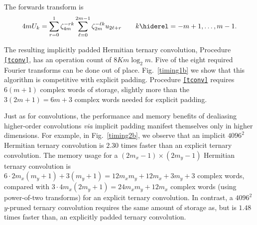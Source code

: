 \documentclass[final]{siamltex}
\def\be{\begin{dmath*}}
\def\ee{\end{dmath*}}
\def\no{\hiderel}
\begin{document}
The forwards transform is
\be
{4m}U_k=\sum_{r=0}^{1}\zeta_{4m}^{-rk}
\sum_{\ell=0}^{2m-1} \zeta_{2m}^{-\ell k} u_{2\ell+r}
\qquad k\no =-m+1,\ldots,m-1.
\ee

The resulting implicitly padded Hermitian ternary convolution,
Procedure {\tt\ref{tconv}}, has an operation count of $8Km\log_2 m$. 
Five of the eight required Fourier transforms can be done out of place.
Fig.~\ref{timing1b} we show that this algorithm is competitive with
explicit padding. Procedure {\tt\ref{tconv}} requires $6(m+1)$ complex words of
storage, slightly more than the $3(2m+1)=6m+3$ complex words needed for explicit
padding.

Just as for convolutions, the performance and memory benefits of
dealiasing higher-order convolutions {\it via\/} implicit padding manifest themselves only in
higher dimensions. For example, in Fig.~\ref{timing2b}, we observe 
that an implicit $4096^2$ Hermitian ternary convolution is $2.30$ times
faster than an explicit ternary convolution.
The memory usage for a $(2m_x-1)\times (2m_y-1)$ Hermitian ternary convolution
is $6\cdot 2m_x(m_y+1)+3(m_y+1)=12m_xm_y+12m_x+3m_y+3$ complex words,
compared with $3\cdot 4m_x(2m_y+1)=24m_xm_y+12m_x$ complex words
(using power-of-two transforms) for an explicit ternary convolution. In contrast, a
$4096^2$ $y$-pruned ternary convolution requires the same amount of storage as, but
is $1.48$ times faster than, an explicitly padded ternary convolution.
\end{document}
